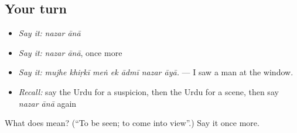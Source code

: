 \subsection*{Your turn}
\begin{itemize}
\raggedright
  \item \emph{Say it:} \emph{nazar ānā}
  \item \emph{Say it:} \emph{nazar ānā}, once more
  \item \emph{Say it:} \emph{mujhe khiṛkī meṅ ek ādmī nazar āyā.} — I saw a man at the window.
  \item \emph{Recall:} say the Urdu for a suspicion, then the Urdu for a scene, then say \emph{nazar ānā} again
\end{itemize}

\begin{tcolorbox}[breakable,colback=teal!4,colframe=teal!35!black,title={Before you move on}]
What does   mean? (\textquotedblleft{}To be seen; to come into view\textquotedblright{}.) Say it once more.
\end{tcolorbox}
